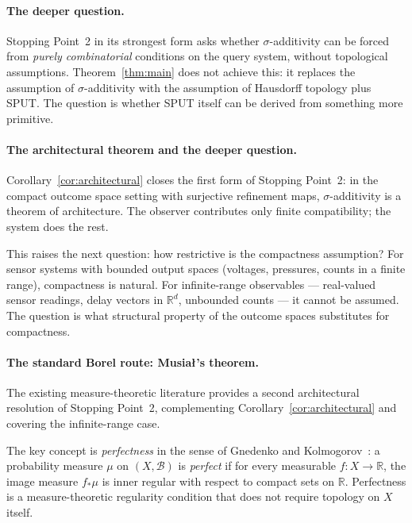 \documentclass[11pt]{article}
\theoremstyle{definition}
\newcommand{\Bcal}{\mathcal{B}}
\begin{document}
\paragraph{The deeper question.}
Stopping Point~2 in its strongest form asks whether $\sigma$-additivity
can be forced from \emph{purely combinatorial} conditions on the
query system, without topological assumptions.  Theorem~\ref{thm:main}
does not achieve this: it replaces the assumption of
$\sigma$-additivity with the assumption of Hausdorff topology plus
SPUT.  The question is whether SPUT itself can be derived from
something more primitive.

\paragraph{The architectural theorem and the deeper question.}
Corollary~\ref{cor:architectural} closes the first form of
Stopping Point~2: in the compact outcome space setting with
surjective refinement maps, $\sigma$-additivity is a theorem of
architecture.  The observer contributes only finite compatibility;
the system does the rest.

This raises the next question: how restrictive is the compactness
assumption?  For sensor systems with bounded output spaces (voltages,
pressures, counts in a finite range), compactness is natural.  For
infinite-range observables --- real-valued sensor readings, delay
vectors in $\mathbb{R}^d$, unbounded counts --- it cannot be assumed.
The question is what structural property of the outcome spaces
substitutes for compactness.

\paragraph{The standard Borel route: Musia{\l}'s theorem.}
The existing measure-theoretic literature provides a second
architectural resolution of Stopping Point~2, complementing
Corollary~\ref{cor:architectural} and covering the infinite-range
case.

The key concept is \emph{perfectness} in the sense of Gnedenko and
Kolmogorov~\cite{Bogachev2007}: a probability measure $\mu$ on
$(X, \Bcal)$ is \emph{perfect} if for every measurable $f: X \to
\mathbb{R}$, the image measure $f_*\mu$ is inner regular with respect
to compact sets on $\mathbb{R}$.  Perfectness is a measure-theoretic
regularity condition that does not require topology on $X$ itself.
\end{document}
